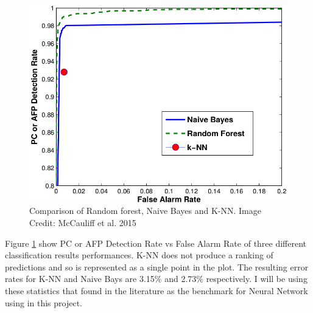 \begin{figure}[!h]
\begin{center}
        \includegraphics[width=0.35\textheight]{img/benchmark.png}
        \caption{Comparison of Random forest, Naive Bayes and K-NN. Image Credit: McCauliff et al. 2015 \cite{2015ApJ...806....6M}}  \label{fig:benchmark}
\end{center}
\end{figure}

Figure \ref{fig:benchmark} show PC or AFP Detection Rate vs False Alarm Rate of three different classification results performances. K-NN does not produce a ranking of predictions and so is represented as a single point in the plot. The resulting error rates for K-NN and Naive Bays are 3.15$\%$ and 2.73$\%$ respectively. I will be using these statistics that found in the literature as the benchmark for Neural Network using in this project.


